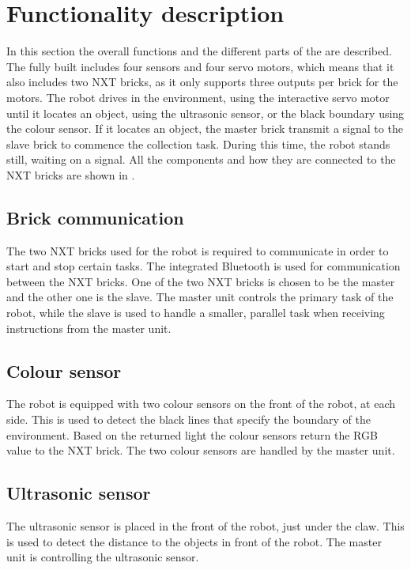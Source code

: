 \section{Functionality description} \label{sec:functionality_description}
In this section the overall functions and the different parts of the \projname{} are described. The fully built \projname{} includes four sensors and four servo motors, which means that it also includes two NXT bricks, as it only supports three outputs per brick for the motors. The robot drives in the environment, using the interactive servo motor until it locates an object, using the ultrasonic sensor, or the black boundary using the colour sensor. If it locates an object, the master brick transmit a signal to the slave brick to commence the collection task. During this time, the robot stands still, waiting on a signal. All the components and how they are connected to the NXT bricks are shown in . 

\subsection{Brick communication}
The two NXT bricks used for the robot is required to communicate in order to start and stop certain tasks. The integrated Bluetooth is used for communication between the NXT bricks. One of the two NXT bricks is chosen to be the master and the other one is the slave. The master unit controls the primary task of the robot, while the slave is used to handle a smaller, parallel task when receiving instructions from the master unit. 

\subsection{Colour sensor} 
The robot is equipped with two colour sensors on the front of the robot, at each side. This is used to detect the black lines that specify the boundary of the environment. Based on the returned light the colour sensors return the RGB value to the NXT brick. The two colour sensors are handled by the master unit. 

\subsection{Ultrasonic sensor}
The ultrasonic sensor is placed in the front of the robot, just under the claw. This is used to detect the distance to the objects in front of the robot. The master unit is controlling the ultrasonic sensor.


